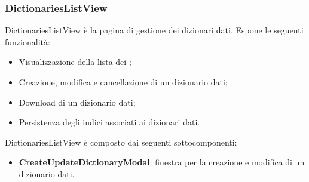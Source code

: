 \subsubsection{DictionariesListView}

\par DictionariesListView è la pagina di gestione  dei dizionari dati. Espone le seguenti funzionalità:
\begin{itemize}
  \item Visualizzazione della lista dei ;
  \item Creazione, modifica e cancellazione di un dizionario dati;
  \item Download di un dizionario dati;
  \item Persistenza degli indici associati ai dizionari dati.
\end{itemize}

\par DictionariesListView è composto dai seguenti sottocomponenti:
\begin{itemize}
  \item \textbf{CreateUpdateDictionaryModal}: finestra per la creazione e modifica di un dizionario dati.
\end{itemize}

